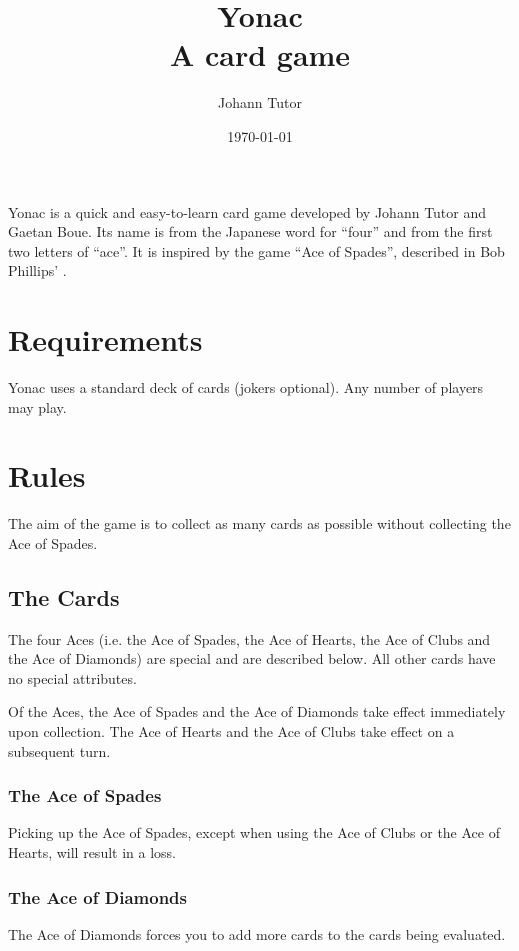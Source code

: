 \documentclass{article}
\begin{document}
\title{Yonac\\ \large A card game}
\author{Johann Tutor}
\date{\today}
\maketitle

Yonac is a quick and easy-to-learn card game developed by Johann Tutor
and Gaetan Boue. Its name is from the Japanese word for ``four'' and
from the first two letters of ``ace''. It is inspired by the game ``Ace
of Spades'', described in Bob Phillips'
.

\tableofcontents

\newpage

\section{Requirements}

Yonac uses a standard deck of cards (jokers optional). Any number of
players may play.

\section{Rules}

The aim of the game is to collect as many cards as possible without
collecting the Ace of Spades.

\subsection{The Cards}
\label{sec:cards}

The four Aces (i.e. the Ace of Spades, the Ace of Hearts, the Ace of Clubs
and the Ace of Diamonds) are special and are described below. All other
cards have no special attributes.

Of the Aces, the Ace of Spades and the Ace of Diamonds take effect
immediately upon collection. The Ace of Hearts and the Ace of Clubs take
effect on a subsequent turn.

\subsubsection{The Ace of Spades}
Picking up the Ace of Spades, except when using the Ace of Clubs or the
Ace of Hearts, will result in a loss.

\subsubsection{The Ace of Diamonds}
The Ace of Diamonds forces you to add more cards to the cards being
evaluated.
\end{document}
